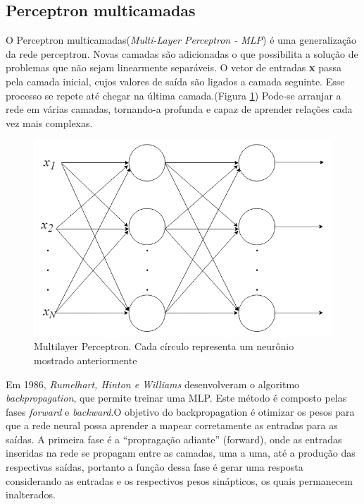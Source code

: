 \subsection{Perceptron multicamadas}

O Perceptron multicamadas(\textit{Multi-Layer Perceptron - MLP}) é uma generalização da rede perceptron. Novas camadas são adicionadas o que possibilita a solução de problemas que não sejam linearmente separáveis. O vetor de entradas \textbf{x} passa pela camada inicial, cujos valores de saída são ligados a camada seguinte. Esse processo se repete até chegar na última camada.(Figura \ref{fig-mlp})  Pode-se arranjar a rede em várias camadas, tornando-a profunda e capaz de aprender relações cada vez mais complexas.

\begin{figure}[h]
	\centering
	\includegraphics[scale=0.4]{pasta1_figuras/mlp.png}
	\caption{Multilayer Perceptron. Cada círculo representa um neurônio mostrado anteriormente}
	\label{fig-mlp}
\end{figure}

Em 1986, \textit{Rumelhart, Hinton e Williams} \cite{hinton1986} desenvolveram o algoritmo \textit{backpropagation}, que permite treinar uma MLP. Este método é composto pelas fases \textit{forward} e \textit{backward}.O objetivo do backpropagation é otimizar os pesos para que a rede neural possa aprender a mapear corretamente as entradas para as saídas. A primeira fase é a ``propragação adiante'' (forward), onde as entradas inseridas na rede se propagam entre as camadas, uma a uma, até a produção das respectivas saídas, portanto a função dessa fase é gerar uma resposta considerando as entradas e os respectivos pesos sinápticos, os quais permanecem inalterados.

